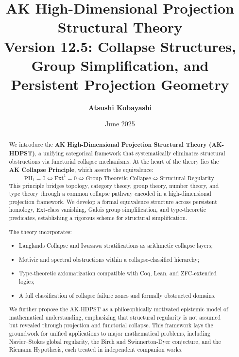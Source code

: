 \documentclass[11pt]{article}
\title{AK High-Dimensional Projection Structural Theory\\
\Large Version 12.5: Collapse Structures, Group Simplification, and Persistent Projection Geometry}
\author{\textbf{Atsushi Kobayashi} \quad {\small (with ChatGPT Research Partner)}}
\date{June 2025}
\begin{document}
\maketitle
\tableofcontents
\newpage


\begin{abstract}
We introduce the \textbf{AK High-Dimensional Projection Structural Theory (AK-HDPST)}, a unifying categorical framework that systematically eliminates structural obstructions via functorial collapse mechanisms. At the heart of the theory lies the \textbf{AK Collapse Principle}, which asserts the equivalence:
\[
\mathrm{PH}_1 = 0 \iff \mathrm{Ext}^1 = 0 \iff \text{Group-Theoretic Collapse} \iff \text{Structural Regularity}.
\]
This principle bridges topology, category theory, group theory, number theory, and type theory through a common collapse pathway encoded in a high-dimensional projection framework. We develop a formal equivalence structure across persistent homology, Ext-class vanishing, Galois group simplification, and type-theoretic predicates, establishing a rigorous scheme for structural simplification.

The theory incorporates:
\begin{itemize}
    \item Langlands Collapse and Iwasawa stratifications as arithmetic collapse layers;
    \item Motivic and spectral obstructions within a collapse-classified hierarchy;
    \item Type-theoretic axiomatization compatible with Coq, Lean, and ZFC-extended logics;
    \item A full classification of collapse failure zones and formally obstructed domains.
\end{itemize}

We further propose the AK-HDPST as a philosophically motivated epistemic model of mathematical understanding, emphasizing that structural regularity is not assumed but revealed through projection and functorial collapse. This framework lays the groundwork for unified applications to major mathematical problems, including Navier–Stokes global regularity, the Birch and Swinnerton-Dyer conjecture, and the Riemann Hypothesis, each treated in independent companion works.
\end{abstract}



\end{document}

